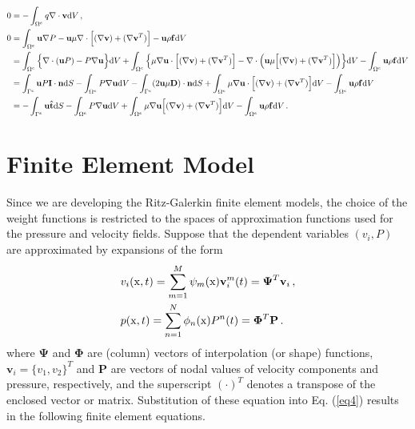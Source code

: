 \documentclass[]{article}
\begin{document}
\begin{equation}\label{eq7}
	\begin{aligned}
		0&=-\int_{\Omega^e} q \nabla \cdot\mathbf{v} \mathrm{d}V\thinspace,\\
		0&=\int_{\Omega^e} \mathbf{u}\nabla P - \mathbf{u}\mu \nabla \cdot \Big[(\nabla \mathbf{v}) + (\nabla \mathbf{v}^T)  \Big]
		- \mathbf{u} \rho \mathbf{f} \mathrm{d}V\\
		&=\int_{\Omega^e}\Big\{\nabla \cdot (\mathbf{u}P) - P\nabla  \mathbf{u} \Big\}\mathrm{d}V
		+\int_{\Omega^e}\Big\{ \mu \nabla \mathbf{u} \cdot\Big[(\nabla \mathbf{v}) + (\nabla \mathbf{v}^T)  \Big] - \nabla \cdot \Big(\mathbf{u}\mu \Big[(\nabla \mathbf{v}) + (\nabla \mathbf{v}^T)  \Big]\Big) \Big\}\mathrm{d}V
		-\int_{\Omega^e}\mathbf{u} \rho \mathbf{f} \mathrm{d}V \\
		&= \int_{\Gamma^e} \mathbf{u}P \mathbf{I} \cdot \mathbf{n} \mathrm{d}S
		-\int_{\Omega^e}P\nabla  \mathbf{u} \mathrm{d}V
		-\int_{\Gamma^e} (2\mathbf{u}\mu \mathbf{D}) \cdot \mathbf{n} \mathrm{d}S
		+\int_{\Omega^e}\mu \nabla\mathbf{u}\cdot\Big[(\nabla \mathbf{v}) + (\nabla \mathbf{v}^T)  \Big] \mathrm{d}V
		-\int_{\Omega^e}\mathbf{u} \rho \mathbf{f} \mathrm{d}V\\
		&=-\int_{\Gamma^e} \mathbf{u} \mathbf{\hat{t}}\mathrm{d}S
		-\int_{\Omega^e}P\nabla \mathbf{u} \mathrm{d}V
		+\int_{\Omega^e}\mu \nabla \mathbf{u} \Big[(\nabla \mathbf{v}) + (\nabla \mathbf{v}^T)  \Big] \mathrm{d}V
		-\int_{\Omega^e}\mathbf{u} \rho \mathbf{f} \mathrm{d}V\thinspace.
	\end{aligned}
\end{equation}
\section{Finite Element Model} \label{sec: FEM}
Since we are developing the Ritz-Galerkin finite element models, the choice
of the weight functions is restricted to the spaces of approximation functions
used for the pressure and velocity fields. Suppose that the dependent variables
$(v_i, P )$ are approximated by expansions of the form
\begin{equation}\label{eq8}
	\begin{aligned}
		&v_i(\mathrm{x}, t)= \sum_{m=1}^{M} \psi_m(\mathrm{x}) \mathbf{v}_i^m(t) = \boldsymbol{\Psi}^T\mathbf{v}_i \thinspace,\\
		&p(\mathrm{x}, t)= \sum_{n=1}^{N} \phi_n(\mathrm{x}) P^n(t) = \boldsymbol{\Phi}^T\mathbf{P} \thinspace.
	\end{aligned}
\end{equation}
where $\boldsymbol{\Psi}$ and $\boldsymbol{\Phi}$ are (column) vectors of interpolation (or shape) functions, $\mathbf{v}_i = \{v_1,v_2\}^T$ and
$\mathbf{P}$ are vectors of nodal values of velocity components and pressure, respectively, and the superscript $(\cdot)^T$ denotes a transpose of the enclosed vector or matrix. Substitution of these equation into Eq. (\ref{eq4}) results in the following finite element equations.
\end{document}
